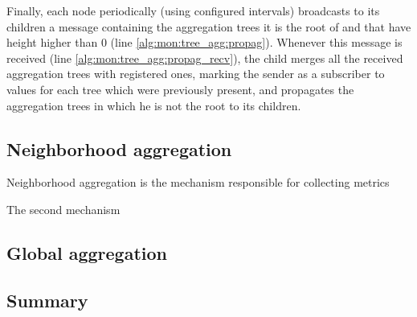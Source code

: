 Finally, each node periodically (using configured intervals) broadcasts to its children a message containing the aggregation trees it is the root of and that have height higher than 0 (line \ref{alg:mon:tree_agg:propag}). Whenever this message is received (line \ref{alg:mon:tree_agg:propag_recv}), the child merges all the received aggregation trees with registered ones, marking the sender as a subscriber to values for each tree which were previously present, and propagates the aggregation trees in which he is not the root to its children.


\subsection{Neighborhood aggregation}

Neighborhood aggregation is the mechanism responsible for collecting metrics 

The second mechanism 

\subsection{Global aggregation}

\subsection{Summary}

